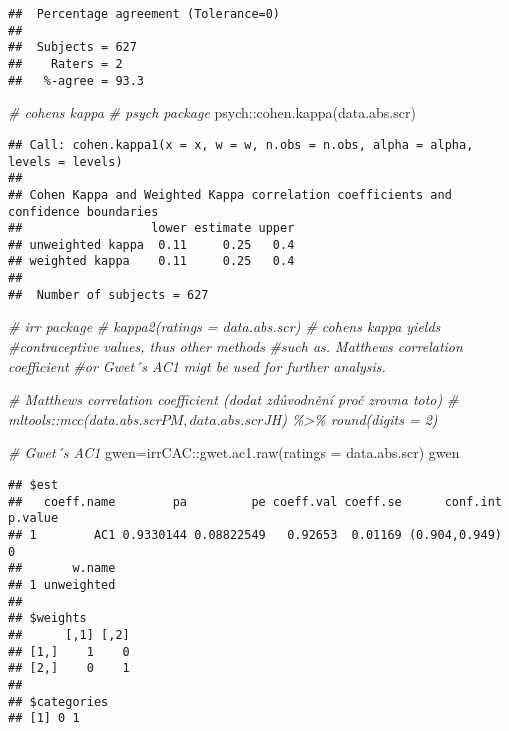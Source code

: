 \documentclass[
  man]{apa6}
\newenvironment{Shaded}{\begin{snugshade}}{\end{snugshade}}
\newcommand{\AttributeTok}[1]{\textcolor[rgb]{0.77,0.63,0.00}{#1}}
\newcommand{\CommentTok}[1]{\textcolor[rgb]{0.56,0.35,0.01}{\textit{#1}}}
\newcommand{\FunctionTok}[1]{\textcolor[rgb]{0.00,0.00,0.00}{#1}}
\newcommand{\NormalTok}[1]{#1}
\newcommand{\OtherTok}[1]{\textcolor[rgb]{0.56,0.35,0.01}{#1}}
\newcommand{\SpecialCharTok}[1]{\textcolor[rgb]{0.00,0.00,0.00}{#1}}
\begin{document}
\begin{verbatim}
##  Percentage agreement (Tolerance=0)
## 
##  Subjects = 627 
##    Raters = 2 
##   %-agree = 93.3
\end{verbatim}

\begin{Shaded}
\begin{Highlighting}[]
\CommentTok{\# cohens kappa}
\CommentTok{\# psych package}
\NormalTok{psych}\SpecialCharTok{::}\FunctionTok{cohen.kappa}\NormalTok{(data.abs.scr)}
\end{Highlighting}
\end{Shaded}

\begin{verbatim}
## Call: cohen.kappa1(x = x, w = w, n.obs = n.obs, alpha = alpha, levels = levels)
## 
## Cohen Kappa and Weighted Kappa correlation coefficients and confidence boundaries 
##                  lower estimate upper
## unweighted kappa  0.11     0.25   0.4
## weighted kappa    0.11     0.25   0.4
## 
##  Number of subjects = 627
\end{verbatim}

\begin{Shaded}
\begin{Highlighting}[]
\CommentTok{\# irr package}
\CommentTok{\# kappa2(ratings = data.abs.scr) \# cohens kappa yields}
\CommentTok{\#contraceptive values, thus other methods }
\CommentTok{\#such as. Matthews correlation coefficient}
\CommentTok{\#or Gwet´s AC1 migt be used for further analysis. }

\CommentTok{\# Matthews correlation coefficient (dodat zdůvodnění proč zrovna toto)}
\CommentTok{\# mltools::mcc(data.abs.scr$PM, data.abs.scr$JH) \%\textgreater{}\% round(digits = 2) }

\CommentTok{\# Gwet´s AC1}
\NormalTok{gwen}\OtherTok{=}\NormalTok{irrCAC}\SpecialCharTok{::}\FunctionTok{gwet.ac1.raw}\NormalTok{(}\AttributeTok{ratings =}\NormalTok{ data.abs.scr)}
\NormalTok{gwen}
\end{Highlighting}
\end{Shaded}

\begin{verbatim}
## $est
##   coeff.name        pa         pe coeff.val coeff.se      conf.int p.value
## 1        AC1 0.9330144 0.08822549   0.92653  0.01169 (0.904,0.949)       0
##       w.name
## 1 unweighted
## 
## $weights
##      [,1] [,2]
## [1,]    1    0
## [2,]    0    1
## 
## $categories
## [1] 0 1
\end{verbatim}
\end{document}
